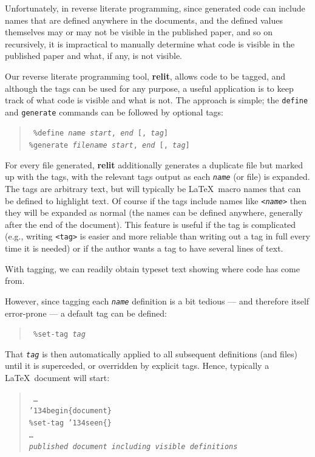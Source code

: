 \documentclass[12pt]{article}
\def\name#1{\textbf{#1}}
\begin{document}
Unfortunately, in reverse literate programming, since generated code can include names that are defined anywhere in the documents, and the defined values themselves may or may not be visible in the published paper, and so on recursively, it is impractical to manually determine what code is visible in the published paper and what, if any, is not visible.

Our reverse literate programming tool, \name{relit}, allows code to be tagged, and although the tags can be used for any purpose, a useful application is to keep track of what code is visible and what is not. The approach is simple; the \texttt{define} and \texttt{generate} commands can be followed by optional tags:

\begin{verse}\tt
\%{}define \emph{name} \emph{start}, \emph{end} [, \emph{tag}] \\
\%{}generate \emph{filename} \emph{start}, \emph{end} [, \emph{tag}]
\end{verse} 

For every file generated, \name{relit} additionally generates a duplicate file but marked up with the tags, with the relevant tags output as each \texttt{\emph{name}} (or file) is expanded. The tags are arbitrary text, but will typically be \LaTeX\ macro names that can be defined to highlight text. Of course if the tags include names like \texttt{<\emph{name}>} then they will be expanded as normal (the names can be defined anywhere, generally after the end of the document). This feature is useful if the tag is complicated (e.g., writing \texttt{<tag>} is easier and more reliable than writing out a tag in full every time it is needed) or if the author wants a tag to have several lines of text.

With tagging, we can readily obtain typeset text showing where code has come from. 

However, since tagging each \texttt{\emph{name}} definition is a bit tedious --- and therefore itself error-prone --- a default tag can be defined:

\begin{verse}\tt
\%{}set-tag \emph{tag} \\
\end{verse}

That \texttt{\emph{tag}} is then automatically applied to all subsequent definitions (and files) until it is superceded, or overridden by explicit tags. Hence, typically a \LaTeX\ document will start:

\begin{verse}\tt
\ldots \\
\char'134begin\{document\}\\
\%{}set-tag \char'134seen\{\} \\
\ldots \\
\emph{published document including visible definitions}
\end{verse}
\end{document}
